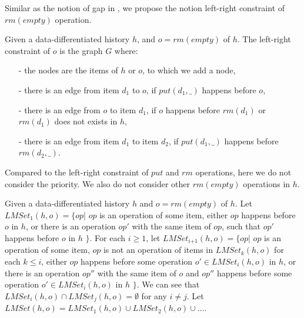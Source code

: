 Similar as the notion of gap in \cite{Bouajjani:2015}, we propose the notion left-right constraint of $\textit{rm}(\textit{empty})$ operation.

\begin{definition}\label{def:left-right constraint for rmEmpty operation}
Given a data-differentiated history $h$, and $o = \textit{rm}(\textit{empty})$ of $h$. The left-right constraint of $o$ is the graph $G$ where:

\begin{itemize}
\setlength{\itemsep}{0.5pt}
\item[-] the nodes are the items of $h$ or $o$, to which we add a node,

\item[-] there is an edge from item $d_1$ to $o$, if $\textit{put}(d_1,\_)$ happens before $o$,

\item[-] there is an edge from $o$ to item $d_1$, if $o$ happens before $\textit{rm}(d_1)$ or $\textit{rm}(d_1)$ does not exists in $h$,

\item[-] there is an edge from item $d_1$ to item $d_2$, if $\textit{put}(d_1,\_)$ happens before $\textit{rm}(d_2,\_)$.
\end{itemize}
\end{definition}

Compared to the left-right constraint of $\textit{put}$ and $\textit{rm}$ operations, here we do not consider the priority. We also do not consider other $\textit{rm}(\textit{empty})$ operations in $h$.

Given a data-differentiated history $h$ and $o = \textit{rm}(\textit{empty})$ of $h$. Let $\textit{LMSet}_1(h,o) = \{ \textit{op} \vert$ $\textit{op}$ is an operation of some item, either $\textit{op}$ happens before $o$ in $h$, or there is an operation $\textit{op}'$ with the same item of $\textit{op}$, such that $\textit{op}'$ happens before $o$ in $h$ $\}$. For each $i \geq 1$, let $\textit{LMSet}_{\textit{i+1}}(h,o) = \{ \textit{op} \vert$ $\textit{op}$ is an operation of some item, $\textit{op}$ is not an operation of items in $\textit{LMSet}_k(h,o)$ for each $k \leq i$, either $\textit{op}$ happens before some operation $o' \in \textit{LMSet}_i(h,o)$ in $h$, or there is an operation $\textit{op}''$ with the same item of $o$ and $\textit{op}''$ happens before some operation $o' \in \textit{LMSet}_i(h,o)$ in $h$ $\}$. We can see that $\textit{LMSet}_i(h,o) \cap \textit{LMSet}_j(h,o) = \emptyset$ for any $i \neq j$. Let $\textit{LMSet}(h,o) = \textit{LMSet}_1(h,o) \cup \textit{LMSet}_2(h,o) \cup \ldots$.


